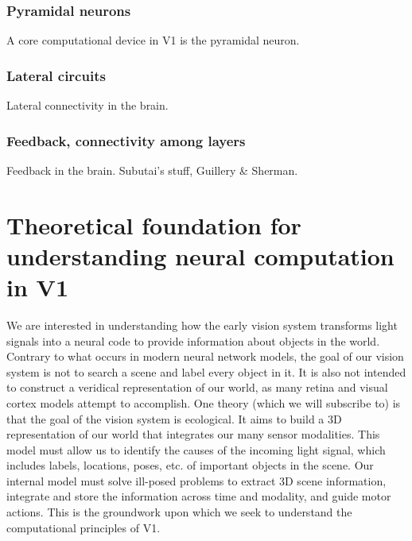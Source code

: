 \subsubsection{Pyramidal neurons}
A core computational device in V1 is the pyramidal neuron.


\subsubsection{Lateral circuits}
Lateral connectivity in the brain.


\subsubsection{Feedback, connectivity among layers}
Feedback in the brain. Subutai's stuff, Guillery \& Sherman.


\section{Theoretical foundation for understanding neural computation in V1}
We are interested in understanding how the early vision system transforms light signals into a neural code to provide information about objects in the world.
Contrary to what occurs in modern neural network models, the goal of our vision system is not to search a scene and label every object in it. It is also not intended to construct a veridical representation of our world, as many retina and visual cortex models attempt to accomplish. One theory (which we will subscribe to) is that the goal of the vision system is ecological. It aims to build a 3D representation of our world that integrates our many sensor modalities. This model must allow us to identify the causes of the incoming light signal, which includes labels, locations, poses, etc. of important objects in the scene. Our internal model must solve ill-posed problems to extract 3D scene information, integrate and store the information across time and modality, and guide motor actions. This is the groundwork upon which we seek to understand the computational principles of V1.


